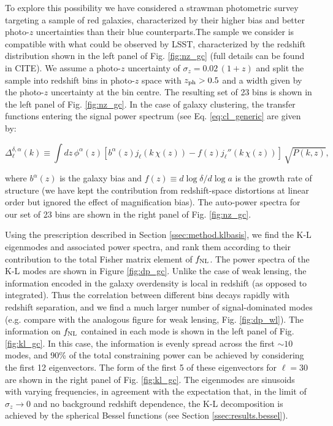 \documentclass[twocolumn,amsfont,amssymb,amsmath, showpacs,balancelastpage, nofootinbib]{revtex4-1}
\begin{document}
    To explore this possibility we have considered a strawman photometric survey targeting a sample of red galaxies, characterized by their higher bias and better photo-$z$ uncertainties than their blue counterparts.The sample we consider is compatible with what could be observed by LSST, characterized by the redshift distribution shown in the left panel of Fig. \ref{fig:nz_gc} (full details can be found in CITE). We assume a photo-$z$ uncertainty of $\sigma_z=0.02\,(1+z)$ and split the sample into redshift bins in photo-$z$ space with $z_{\rm ph}>0.5$ and a width given by the photo-$z$ uncertainty at the bin centre. The resulting set of 23 bins is shown in the left panel of Fig. \ref{fig:nz_gc}. In the case of galaxy clustering, the transfer functions entering the signal power spectrum (see Eq. \ref{eq:cl_generic} are given by:
    \begin{widetext}
    \begin{equation}
      \Delta^{\delta,\alpha}_\ell(k)\equiv\int dz\,\phi^\alpha(z)\left[b^\alpha(z)j_\ell(k\,\chi(z))-f(z)j_\ell''(k\,\chi(z))\right]\,\sqrt{P(k,z)},
    \end{equation}
    \end{widetext}
    where $b^\alpha(z)$ is the galaxy bias and $f(z)\equiv d\log\delta/d\log a$ is the growth rate of structure (we have kept the contribution from redshift-space distortions at linear order but ignored the effect of magnification bias). The auto-power spectra for our set of 23 bins are shown in the right panel of Fig. \ref{fig:nz_gc}.
    
    Using the prescription described in Section \ref{ssec:method.klbasis}, we find the K-L eigenmodes and associated power spectra, and rank them according to their contribution to the total Fisher matrix element of $f_{\rm NL}$. The power spectra of the K-L modes are shown in Figure \ref{fig:dp_gc}. Unlike the case of weak lensing, the information encoded in the galaxy overdensity is local in redshift (as opposed to integrated). Thus the correlation between different bins decays rapidly with redshift separation, and we find a much larger number of signal-dominated modes (e.g. compare with the analogous figure for weak lensing, Fig. \ref{fig:dp_wl}). The information on $f_{\rm NL}$ contained in each mode is shown in the left panel of Fig. \ref{fig:kl_gc}. In this case, the information is evenly spread across the first $\sim10$ modes, and 90\% of the total constraining power can be achieved by considering the first 12 eigenvectors. The form of the first 5 of these eigenvectors for $\ell=30$ are shown in the right panel of Fig. \ref{fig:kl_gc}. The eigenmodes are sinusoids with varying frequencies, in agreement with the expectation that, in the limit of $\sigma_z\rightarrow0$ and no background redshift dependence, the K-L decomposition is achieved by the spherical Bessel functions (see Section \ref{ssec:results.bessel}).
    
\end{document}

